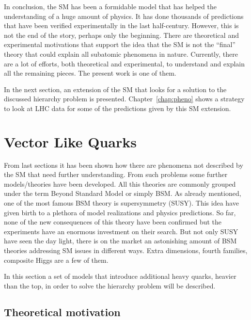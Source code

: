 In conclusion, the SM has been a formidable model that has helped the understanding of a huge amount of physics. It has done thousands of predictions that have been verified experimentally in the last half-century. However, this is not the end of the story, perhaps only the beginning. There are theoretical and experimental motivations that support the idea that the SM is not the ``final'' theory that could explain all subatomic phenomena in nature. Currently, there are a lot of efforts, both theoretical and experimental, to understand and explain all the remaining pieces. The present work is one of them.

In the next section, an extension of the SM that looks for a solution to the discussed hierarchy problem is presented. Chapter~\ref{chap:pheno} shows a strategy to look at LHC data for some of the predictions given by this SM extension.  %

\section{Vector Like Quarks}

\label{chap:VLQ}

From last sections it has been shown how there are phenomena not described by the SM that need further understanding. From such problems some further models/theories have been developed. All this theories are commonly grouped under the term Beyond Standard Model or simply BSM. As already mentioned, one of the most famous BSM theory is supersymmetry (SUSY). This idea have given birth to a plethora of model realizations and physics predictions. So far, none of the new consequences of this theory have been confirmed but the experiments have an enormous investment on their search. But not only SUSY have seen the day light, there is on the market an astonishing amount of BSM theories addressing SM issues in different ways. Extra dimensions, fourth families, composite Higgs are a few of them.

In this section a set of models that introduce additional heavy quarks, heavier than the top, in order to solve the hierarchy problem will be described. %

\subsection{Theoretical motivation}
\label{sec:motiv}

